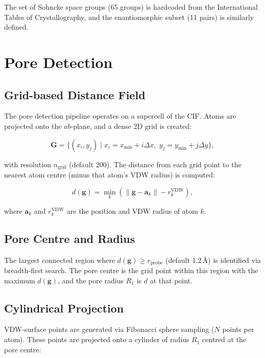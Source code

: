 \documentclass[11pt,a4paper]{article}
\newcommand{\vect}[1]{\bm{#1}}
\begin{document}
The set of Sohncke space groups (65 groups) is hardcoded from the
International Tables of Crystallography, and the enantiomorphic subset
(11 pairs) is similarly defined.

\section{Pore Detection}

\subsection{Grid-based Distance Field}

The pore detection pipeline operates on a supercell of the CIF.  Atoms
are projected onto the $ab$-plane, and a dense 2D grid is created:

\begin{equation}
\vect{G} = \{(x_i, y_j) \mid x_i = x_{\min} + i\Delta x,\;
y_j = y_{\min} + j\Delta y\},
\end{equation}

with resolution $n_{\text{grid}}$ (default 200).  The distance from each
grid point to the nearest atom centre (minus that atom's VDW radius) is
computed:

\begin{equation}
d(\vect{g}) = \min_k \left( \|\vect{g} - \vect{a}_k\| - r_k^{\text{VDW}} \right),
\end{equation}

where $\vect{a}_k$ and $r_k^{\text{VDW}}$ are the position and VDW
radius of atom $k$.

\subsection{Pore Centre and Radius}

The largest connected region where $d(\vect{g}) \ge r_{\text{probe}}$
(default 1.2\,\AA) is identified via breadth-first search.  The pore
centre is the grid point within this region with the maximum $d(\vect{g})$,
and the pore radius $R_1$ is $d$ at that point.

\subsection{Cylindrical Projection}

VDW-surface points are generated via Fibonacci sphere sampling ($N$
points per atom).  These points are projected onto a cylinder of radius
$R_1$ centred at the pore centre:
\end{document}
